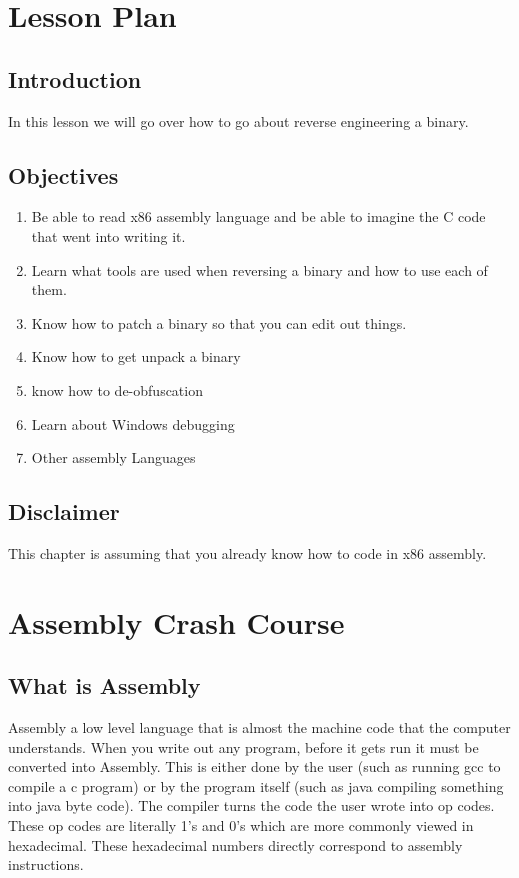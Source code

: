 \documentclass{report}
\begin{document}
\tableofcontents

\newpage

\chapter{Lesson Plan}
 
\section{Introduction}
In this lesson we will go over how to go about reverse engineering a binary.
 
\section{Objectives}
 \begin{enumerate}
    \item Be able to read x86 assembly language and be able to imagine the C code that went into writing it.
    \item Learn what tools are used when reversing a binary and how to use each of them.
    \item Know how to patch a binary so that you can edit out things.
    \item Know how to get unpack a binary
    \item know how to de-obfuscation
    \item Learn about Windows debugging 
    \item Other assembly Languages
\end{enumerate}

\section{Disclaimer}
This chapter is assuming that you already know how to code in x86 assembly.

\newpage

\chapter{Assembly Crash Course}

\section{What is Assembly}
Assembly a low level language that is almost the machine code that the computer understands.  When you write out any program, before it gets run it must be converted into Assembly.  This is either done by the user (such as running gcc to compile a c program) or by the program itself (such as java compiling something into java byte code).  The compiler turns the code the user wrote into op codes.  These op codes are literally 1's and 0's which are more commonly viewed in hexadecimal.  These hexadecimal numbers directly correspond to assembly instructions.  
\end{document}
